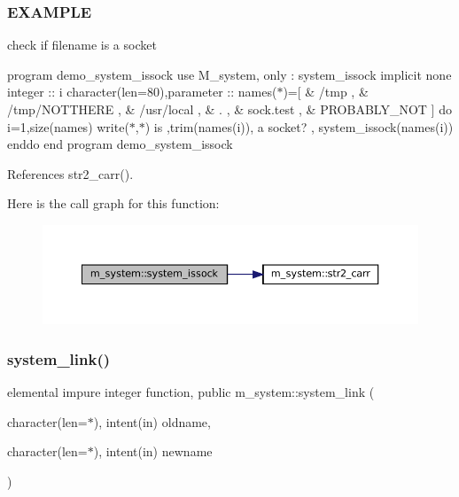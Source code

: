 \subsubsection*{E\+X\+A\+M\+P\+LE}

check if filename is a socket

program demo\+\_\+system\+\_\+issock use M\+\_\+system, only \+: system\+\_\+issock implicit none integer \+:\+: i character(len=80),parameter \+:\+: names($\ast$)=\mbox{[} \& \textquotesingle{}/tmp \textquotesingle{}, \& \textquotesingle{}/tmp/\+N\+O\+T\+T\+H\+E\+RE \textquotesingle{}, \& \textquotesingle{}/usr/local \textquotesingle{}, \& \textquotesingle{}. \textquotesingle{}, \& \textquotesingle{}sock.\+test \textquotesingle{}, \& \textquotesingle{}P\+R\+O\+B\+A\+B\+L\+Y\+\_\+\+N\+OT \textquotesingle{}\mbox{]} do i=1,size(names) write($\ast$,$\ast$)\textquotesingle{} is \textquotesingle{},trim(names(i)),\textquotesingle{} a socket? \textquotesingle{}, system\+\_\+issock(names(i)) enddo end program demo\+\_\+system\+\_\+issock 

References str2\+\_\+carr().

Here is the call graph for this function\+:\nopagebreak
\begin{figure}[H]
\begin{center}
\leavevmode
\includegraphics[width=350pt]{namespacem__system_af6eb5074fe74552bc7a5e7d00f459087_cgraph}
\end{center}
\end{figure}
\mbox{\label{namespacem__system_a0e04b5499fc3367eda9758b6e396a103}} 
\subsubsection{\texorpdfstring{system\+\_\+link()}{system\_link()}}
{\footnotesize\ttfamily elemental impure integer function, public m\+\_\+system\+::system\+\_\+link (\begin{DoxyParamCaption}\item[{character(len=$\ast$), intent(in)}]{oldname,  }\item[{character(len=$\ast$), intent(in)}]{newname }\end{DoxyParamCaption})}



